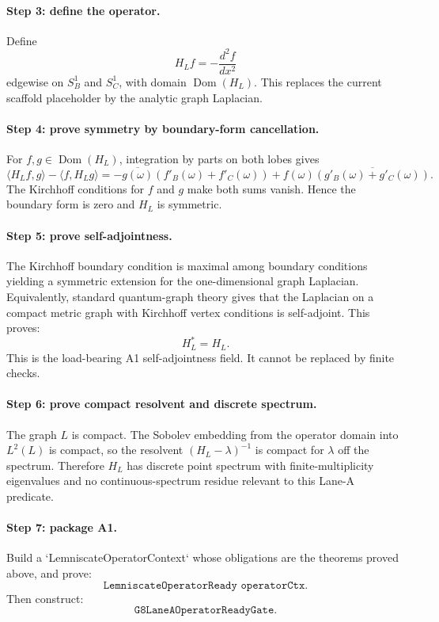 \documentclass[11pt]{article}
\newcommand{\Dom}{\operatorname{Dom}}
\begin{document}
\paragraph{Step 3: define the operator.}
Define
\[
  H_L f = -\frac{d^2 f}{dx^2}
\]
edgewise on \(S^1_B\) and \(S^1_C\), with domain \(\Dom(H_L)\).  This
replaces the current scaffold placeholder by the analytic graph Laplacian.

\paragraph{Step 4: prove symmetry by boundary-form cancellation.}
For \(f,g\in\Dom(H_L)\), integration by parts on both lobes gives
\[
  \langle H_Lf,g\rangle-\langle f,H_Lg\rangle
  =
  -\overline{g(\omega)}(f'_B(\omega)+f'_C(\omega))
  +f(\omega)\overline{(g'_B(\omega)+g'_C(\omega))}.
\]
The Kirchhoff conditions for \(f\) and \(g\) make both sums vanish.  Hence the
boundary form is zero and \(H_L\) is symmetric.

\paragraph{Step 5: prove self-adjointness.}
The Kirchhoff boundary condition is maximal among boundary conditions yielding
a symmetric extension for the one-dimensional graph Laplacian.  Equivalently,
standard quantum-graph theory gives that the Laplacian on a compact metric
graph with Kirchhoff vertex conditions is self-adjoint.  This proves:
\[
  H_L^*=H_L.
\]
This is the load-bearing A1 self-adjointness field.  It cannot be replaced by
finite checks.

\paragraph{Step 6: prove compact resolvent and discrete spectrum.}
The graph \(L\) is compact.  The Sobolev embedding from the operator domain
into \(L^2(L)\) is compact, so the resolvent \((H_L-\lambda)^{-1}\) is compact
for \(\lambda\) off the spectrum.  Therefore \(H_L\) has discrete point
spectrum with finite-multiplicity eigenvalues and no continuous-spectrum
residue relevant to this Lane-A predicate.

\paragraph{Step 7: package A1.}
Build a `LemniscateOperatorContext` whose obligations are the theorems proved
above, and prove:
\[
  \texttt{LemniscateOperatorReady operatorCtx}.
\]
Then construct:
\[
  \texttt{G8LaneAOperatorReadyGate}.
\]
\end{document}
